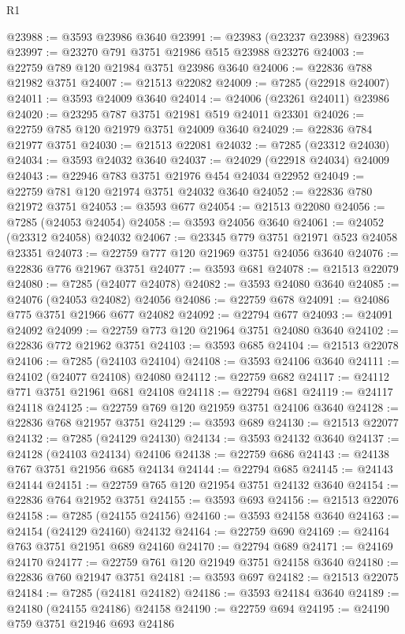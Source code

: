 \begin{lexlean}{R1}
\begin{coremodule}
@23988 := @3593 @23986 @3640
@23991 := @23983 (@23237 @23988) @23963
@23997 := @23270 @791 @3751 @21986 @515 @23988 @23276
@24003 := @22759 @789 @120 @21984 @3751 @23986 @3640
@24006 := @22836 @788 @21982 @3751
@24007 := @21513 @22082
@24009 := @7285 (@22918 @24007)
@24011 := @3593 @24009 @3640
@24014 := @24006 (@23261 @24011) @23986
@24020 := @23295 @787 @3751 @21981 @519 @24011 @23301
@24026 := @22759 @785 @120 @21979 @3751 @24009 @3640
@24029 := @22836 @784 @21977 @3751
@24030 := @21513 @22081
@24032 := @7285 (@23312 @24030)
@24034 := @3593 @24032 @3640
@24037 := @24029 (@22918 @24034) @24009
@24043 := @22946 @783 @3751 @21976 @454 @24034 @22952
@24049 := @22759 @781 @120 @21974 @3751 @24032 @3640
@24052 := @22836 @780 @21972 @3751
@24053 := @3593 @677
@24054 := @21513 @22080
@24056 := @7285 (@24053 @24054)
@24058 := @3593 @24056 @3640
@24061 := @24052 (@23312 @24058) @24032
@24067 := @23345 @779 @3751 @21971 @523 @24058 @23351
@24073 := @22759 @777 @120 @21969 @3751 @24056 @3640
@24076 := @22836 @776 @21967 @3751
@24077 := @3593 @681
@24078 := @21513 @22079
@24080 := @7285 (@24077 @24078)
@24082 := @3593 @24080 @3640
@24085 := @24076 (@24053 @24082) @24056
@24086 := @22759 @678
@24091 := @24086 @775 @3751 @21966 @677 @24082
@24092 := @22794 @677
@24093 := @24091 @24092
@24099 := @22759 @773 @120 @21964 @3751 @24080 @3640
@24102 := @22836 @772 @21962 @3751
@24103 := @3593 @685
@24104 := @21513 @22078
@24106 := @7285 (@24103 @24104)
@24108 := @3593 @24106 @3640
@24111 := @24102 (@24077 @24108) @24080
@24112 := @22759 @682
@24117 := @24112 @771 @3751 @21961 @681 @24108
@24118 := @22794 @681
@24119 := @24117 @24118
@24125 := @22759 @769 @120 @21959 @3751 @24106 @3640
@24128 := @22836 @768 @21957 @3751
@24129 := @3593 @689
@24130 := @21513 @22077
@24132 := @7285 (@24129 @24130)
@24134 := @3593 @24132 @3640
@24137 := @24128 (@24103 @24134) @24106
@24138 := @22759 @686
@24143 := @24138 @767 @3751 @21956 @685 @24134
@24144 := @22794 @685
@24145 := @24143 @24144
@24151 := @22759 @765 @120 @21954 @3751 @24132 @3640
@24154 := @22836 @764 @21952 @3751
@24155 := @3593 @693
@24156 := @21513 @22076
@24158 := @7285 (@24155 @24156)
@24160 := @3593 @24158 @3640
@24163 := @24154 (@24129 @24160) @24132
@24164 := @22759 @690
@24169 := @24164 @763 @3751 @21951 @689 @24160
@24170 := @22794 @689
@24171 := @24169 @24170
@24177 := @22759 @761 @120 @21949 @3751 @24158 @3640
@24180 := @22836 @760 @21947 @3751
@24181 := @3593 @697
@24182 := @21513 @22075
@24184 := @7285 (@24181 @24182)
@24186 := @3593 @24184 @3640
@24189 := @24180 (@24155 @24186) @24158
@24190 := @22759 @694
@24195 := @24190 @759 @3751 @21946 @693 @24186

\end{coremodule}
\end{lexlean}
